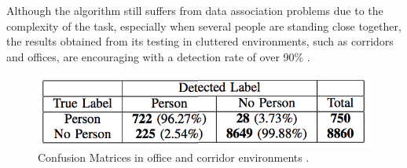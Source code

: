 Although the algorithm still suffers from data association problems due to the complexity of the task, especially when several people are standing close together, the results obtained from its testing in cluttered environments, such as corridors and offices, are encouraging with a detection rate of over 90\% \cite{arras2007using}.

\begin{figure}[!htbp]
\begin{center}
\includegraphics[width=.5\linewidth]{images/leg_cfm.png}
\end{center}
\caption{Confusion Matrices in office and corridor environments \cite{arras2007using}.}
\end{figure}